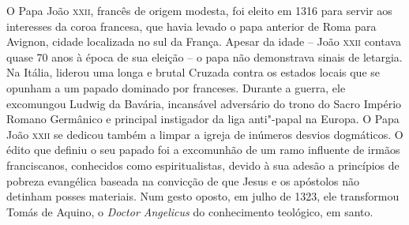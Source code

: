 O Papa João \textsc{xxii}, francês de origem modesta, foi eleito em 1316 para
servir aos interesses da coroa francesa, que havia levado o papa
anterior de Roma para Avignon, cidade localizada no sul da França.
Apesar da idade -- João \textsc{xxii} contava quase 70 anos à época de sua
eleição -- o papa não demonstrava sinais de letargia. Na Itália, liderou
uma longa e brutal Cruzada contra os estados locais que se opunham a um
papado dominado por franceses. Durante a guerra, ele excomungou Ludwig
da Bavária, incansável adversário do trono do Sacro Império Romano
Germânico e principal instigador da liga anti"-papal na Europa. O Papa
João \textsc{xxii} se dedicou também a limpar a igreja de inúmeros desvios
dogmáticos. O édito que definiu o seu papado foi a excomunhão de um ramo
influente de irmãos franciscanos, conhecidos como espiritualistas,
devido à sua adesão a princípios de pobreza evangélica baseada na
convicção de que Jesus e os apóstolos não detinham posses materiais. Num
gesto oposto, em julho de 1323, ele transformou Tomás de Aquino, o
\textit{Doctor Angelicus} do conhecimento teológico, em santo.

